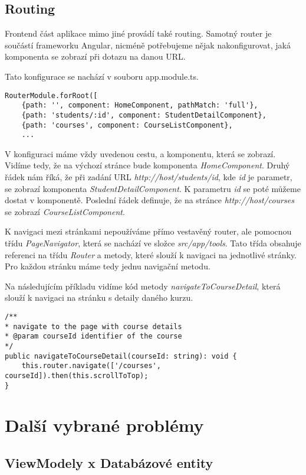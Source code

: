 \subsection{Routing}

Frontend část aplikace mimo jiné provádí také routing. Samotný router je součástí frameworku Angular, nicméně potřebujeme nějak nakonfigurovat, jaká komponenta se zobrazí při dotazu na danou URL.

Tato konfigurace se nachází v souboru app.module.ts.
\lstset{style=typescript}
\begin{lstlisting}
RouterModule.forRoot([
	{path: '', component: HomeComponent, pathMatch: 'full'},
	{path: 'students/:id', component: StudentDetailComponent},
	{path: 'courses', component: CourseListComponent},
	...
\end{lstlisting}

V konfiguraci máme vždy uvedenou cestu, a komponentu, která se zobrazí.
Vidíme tedy, že na výchozí stránce bude komponenta \textit{HomeComponent}. 
Druhý řádek nám říká, že při zadání URL \textit{http://host/students/id}, kde \textit{id} je parametr, se zobrazí komponenta \textit{StudentDetailComponent}. K parametru \textit{id} se poté můžeme dostat v komponentě.
Poslední řádek definuje, že na stránce \textit{http://host/courses} se zobrazí \textit{CourseListComponent}.

K navigaci mezi stránkami nepoužíváme přímo vestavěný router, ale pomocnou třídu \textit{PageNavigator}, která se nachází ve složce \textit{src/app/tools}. Tato třída obsahuje referenci na třídu \textit{Router} a metody, které slouží k navigaci na jednotlivé stránky. Pro každou stránku máme tedy jednu navigační metodu.

Na následujícím příkladu vidíme kód metody \textit{navigateToCourseDetail}, která slouží k navigaci na stránku s detaily daného kurzu.
\begin{lstlisting}
/**
* navigate to the page with course details
* @param courseId identifier of the course
*/
public navigateToCourseDetail(courseId: string): void {
	this.router.navigate(['/courses', courseId]).then(this.scrollToTop);
}
\end{lstlisting}


\section{Další vybrané problémy}

\subsection{ViewModely x Databázové entity}

